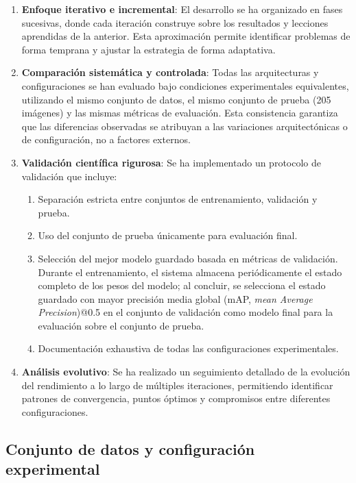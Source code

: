 \begin{enumerate}
    \item \textbf{Enfoque iterativo e incremental}: El desarrollo se ha organizado en fases sucesivas, donde cada iteración construye sobre los resultados y lecciones aprendidas de la anterior. Esta aproximación permite identificar problemas de forma temprana y ajustar la estrategia de forma adaptativa.
    
    \item \textbf{Comparación sistemática y controlada}: Todas las arquitecturas y configuraciones se han evaluado bajo condiciones experimentales equivalentes, utilizando el mismo conjunto de datos, el mismo conjunto de prueba (205 imágenes) y las mismas métricas de evaluación. Esta consistencia garantiza que las diferencias observadas se atribuyan a las variaciones arquitectónicas o de configuración, no a factores externos.
    
    \item \textbf{Validación científica rigurosa}: Se ha implementado un protocolo de validación que incluye:
    \begin{enumerate}
        \item Separación estricta entre conjuntos de entrenamiento, validación y prueba.
        \item Uso del conjunto de prueba únicamente para evaluación final.
        \item Selección del mejor modelo guardado basada en métricas de validación. Durante el entrenamiento, el sistema almacena periódicamente el estado completo de los pesos del modelo; al concluir, se selecciona el estado guardado con mayor precisión media global (mAP, \textit{mean Average Precision})@0.5 en el conjunto de validación como modelo final para la evaluación sobre el conjunto de prueba.
        \item Documentación exhaustiva de todas las configuraciones experimentales.
    \end{enumerate}
    
    \item \textbf{Análisis evolutivo}: Se ha realizado un seguimiento detallado de la evolución del rendimiento a lo largo de múltiples iteraciones, permitiendo identificar patrones de convergencia, puntos óptimos y compromisos entre diferentes configuraciones.
\end{enumerate}

\subsection{Conjunto de datos y configuración experimental}

